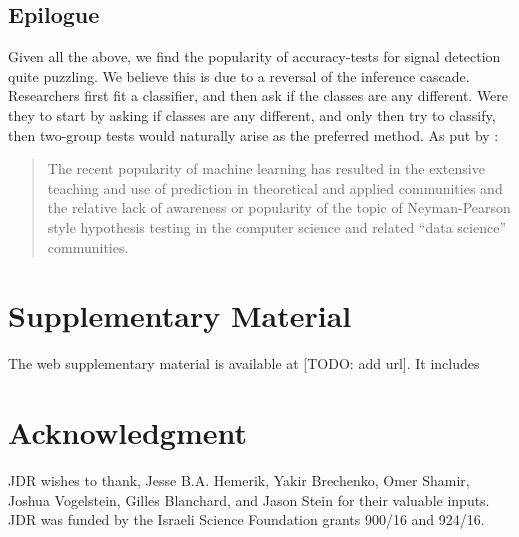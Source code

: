 \documentclass[]{bio}
\begin{document}
\subsection{Epilogue}
Given all the above, we find the popularity of accuracy-tests for signal detection quite puzzling. 
We believe this is due to a reversal of the inference cascade. 
Researchers first fit a classifier, and then ask if the classes are any different.
Were they to start by asking if classes are any different, and only then try to classify, then two-group tests would naturally arise as the preferred method. 
As put by \cite{ramdas_classification_2016}:
\begin{quote}
	The recent popularity of machine learning has resulted in the extensive teaching and use
	of prediction in theoretical and applied communities and the relative lack of awareness or
	popularity of the topic of Neyman-Pearson style hypothesis testing in the computer science
	and related ``data science'' communities.
\end{quote}


\section{Supplementary Material}
The web supplementary material is available at [TODO: add url]. 
It includes 



\section*{Acknowledgment}
JDR wishes to thank, Jesse B.A. Hemerik, Yakir Brechenko, Omer Shamir, Joshua Vogelstein, Gilles Blanchard, and Jason Stein for their valuable inputs. 
JDR was funded by the Israeli Science Foundation grants 900/16 and 924/16. 


\newpage


\end{document}
